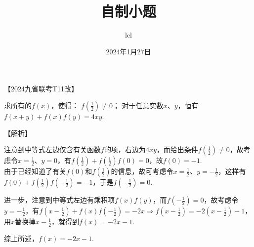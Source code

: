 \documentclass[11pt]{article}
\title{自制小题}
\date{2024年1月27日}
\author{lcl}
\begin{document}
\maketitle
【2024九省联考T11改】\par
求所有的$f(x)$，使得：
 $f(\frac{1}{2}) \neq 0$； 对于任意实数$x$、$y$，恒有$f(x+y)+f(x)f(y)=4xy$.\par
【解析】\par
注意到中等式左边仅含有关函数$f$的项，右边为$4xy$，而给出条件$f(\frac{1}{2}) \neq 0$，故考虑令$x=\frac{1}{2}$、$y=0$，有$f(\frac{1}{2})+f(\frac{1}{2})f(0)=0$，故$f(0)=-1$.\\

由于已经知道了有关$f(0)$和$f(\frac{1}{2})$的信息，故可考虑令$x=\frac{1}{2}$、$y=-\frac{1}{2}$，这样有$f(0)+f(\frac{1}{2})f(-\frac{1}{2})=-1$，于是$f(-\frac{1}{2})=0$.\par

进一步，注意到中等式左边有乘积项$f(x)f(y)$，而$f(-\frac{1}{2})=0$，故考虑令$y=-\frac{1}{2}$，有$f(x-\frac{1}{2})+f(x)f(-\frac{1}{2})=-2x \Rightarrow f(x-\frac{1}{2})=-2(x-\frac{1}{2})-1$，用$x$替换掉$x-\frac{1}{2}$，就得到$f(x)=-2x-1$.\par

综上所述，$f(x)=-2x-1$.
\end{document}
